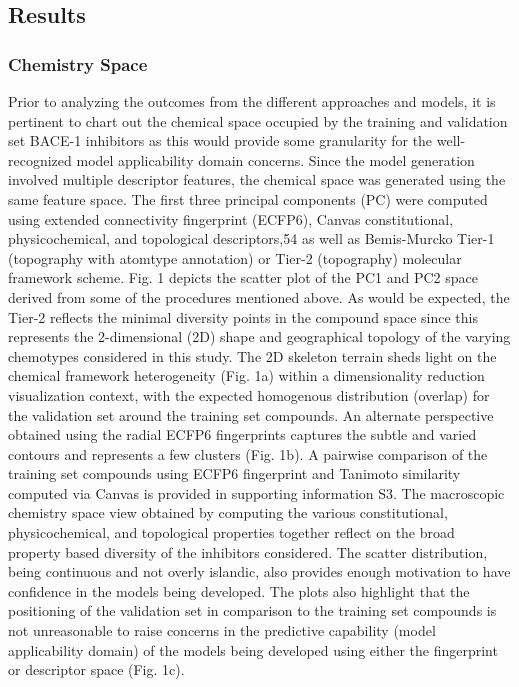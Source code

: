 \subsection{Results}

\subsubsection{Chemistry Space}
Prior to analyzing the outcomes from the different approaches and models, it is pertinent to chart out the chemical space occupied by the training and validation set BACE-1 inhibitors as this would provide some granularity for the well-recognized model applicability domain concerns.  Since the model generation involved multiple descriptor features, the chemical space was generated using the same feature space.  The first three principal components (PC) were computed using extended connectivity fingerprint (ECFP6), Canvas constitutional, physicochemical, and topological descriptors,54 as well as Bemis-Murcko Tier-1 (topography with atomtype annotation) or Tier-2 (topography) molecular framework scheme.  Fig. 1 depicts the scatter plot of the PC1 and PC2 space derived from some of the procedures mentioned above.  As would be expected, the Tier-2 reflects the minimal diversity points in the compound space since this represents the 2-dimensional (2D) shape and geographical topology of the varying chemotypes considered in this study.  The 2D skeleton terrain sheds light on the chemical framework heterogeneity (Fig. 1a) within a dimensionality reduction visualization context, with the expected homogenous distribution (overlap) for the validation set around the training set compounds.  An alternate perspective obtained using the radial ECFP6 fingerprints captures the subtle and varied contours and represents a few clusters (Fig. 1b).  A pairwise comparison of the training set compounds using ECFP6 fingerprint and Tanimoto similarity computed via Canvas is provided in supporting information S3.  The macroscopic chemistry space view obtained by computing the various constitutional, physicochemical, and topological properties together reflect on the broad property based diversity of the inhibitors considered.  The scatter distribution, being continuous and not overly islandic, also provides enough motivation to have confidence in the models being developed.  The plots also highlight that the positioning of the validation set in comparison to the training set compounds is not unreasonable to raise concerns in the predictive capability (model applicability domain) of the models being developed using either the fingerprint or descriptor space (Fig. 1c).

